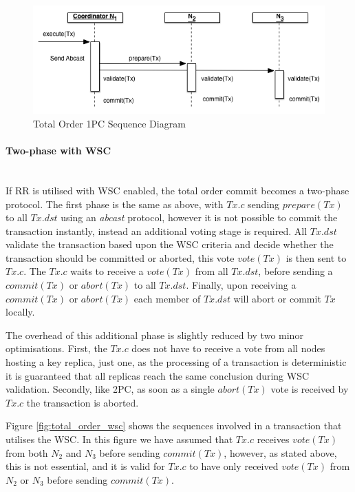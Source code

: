             \begin{figure}[htbp!] 
                \centering    
                \includegraphics[width=1.0\textwidth]{1PC-Abcast}
                \caption[Total Order One-phase Commit Protocol]{Total Order 1PC Sequence Diagram}
                \label{fig:total_order_1PC}
            \end{figure}	        
	        
		        
			\paragraph{Two-phase with WSC} \hspace{0pt} \\        
	        If RR is utilised with WSC enabled, the total order commit becomes a two-phase protocol.  The first phase is the same as above, with $Tx.c$ sending $prepare(Tx)$ to all $Tx.dst$ using an \emph{abcast} protocol, however it is not possible to commit the transaction instantly, instead an additional voting stage is required.  All $Tx.dst$ validate the transaction based upon the WSC criteria and decide whether the transaction should be committed or aborted, this vote $vote(Tx)$ is then sent to $Tx.c$.  The $Tx.c$ waits to receive a $vote(Tx)$ from all $Tx.dst$, before sending a $commit(Tx)$ or $abort(Tx)$ to all $Tx.dst$.  Finally, upon receiving a $commit(Tx)$ or $abort(Tx)$ each member of $Tx.dst$ will abort or commit $Tx$ locally.          
	        
			The overhead of this additional phase is slightly reduced by two minor optimisations.  First, the $Tx.c$ does not have to receive a vote from all nodes hosting a key replica, just one, as the processing of a transaction is deterministic it is guaranteed that all replicas reach the same conclusion during WSC validation.  Secondly, like 2PC, as soon as a single $abort(Tx)$ vote is received by $Tx.c$ the transaction is aborted.  
			
			Figure \ref{fig:total_order_wsc} shows the sequences involved in a transaction that utilises the WSC.  In this figure we have assumed that $Tx.c$ receives $vote(Tx)$ from both $N_2$ and $N_3$ before sending $commit(Tx)$, however, as stated above, this is not essential, and it is valid for $Tx.c$ to have only received $vote(Tx)$ from $N_2$ or $N_3$ before sending $commit(Tx)$.  
	        
